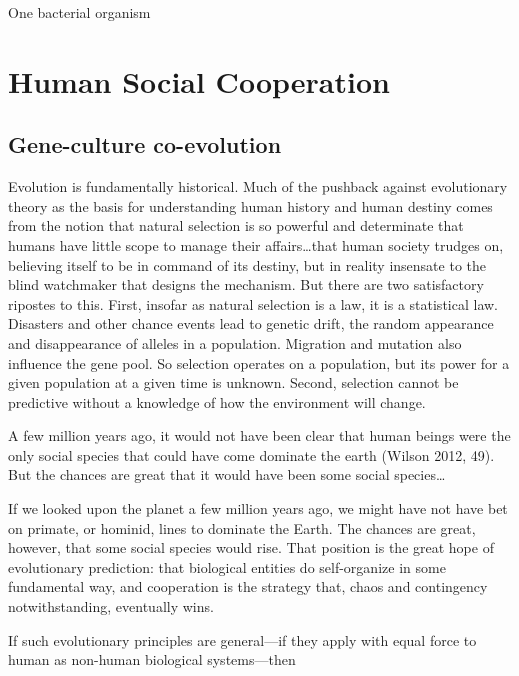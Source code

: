 \documentclass{tufte-book} %
\begin{document}
One bacterial organism




\chapter{Human Social Cooperation}\label{social-coop}

\section{Gene-culture co-evolution}

Evolution is fundamentally historical. Much of the pushback against evolutionary theory as the basis for understanding human history and human destiny comes from the notion that natural selection is so powerful and determinate that humans have little scope to manage their affairs…that human society trudges on, believing itself to be in command of its destiny, but in reality insensate to the blind watchmaker that designs the mechanism. 
But there are two satisfactory ripostes to this. First, insofar as natural selection is a law, it is a statistical law.  Disasters and other chance events lead to genetic drift, the random appearance and disappearance of alleles in a population. Migration and mutation also influence the gene pool. So selection operates on a population, but its power for a given population at a given time is unknown. Second, selection cannot be predictive without a knowledge of how the environment will change. 


A few million years ago, it would not have been clear that human beings were the only social species that could have come dominate the earth (Wilson 2012, 49). But the chances are great that it would have been some social species…


If we looked upon the planet a few million years ago, we might have not have bet on primate, or hominid, lines to dominate the Earth. The chances are great, however, that some social species would rise. That position is the great hope of evolutionary prediction: that biological entities do self-organize in some fundamental way, and cooperation is the strategy that, chaos and contingency notwithstanding, eventually wins. 

If such evolutionary principles are general—if they apply with equal force to human as non-human biological systems—then 
\end{document}
